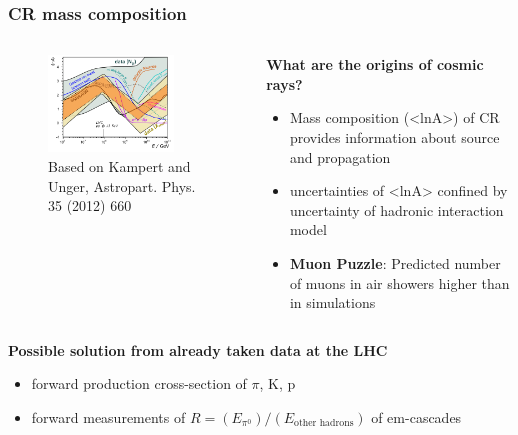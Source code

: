 \documentclass[aspectratio=1610, 9pt]{beamer}
\begin{document}
\begin{frame}\frametitle{CR mass composition}
  \begin{columns}
    \begin{column}[c]{0.48\textwidth}
      \begin{figure}
        \includegraphics[width=0.8\textwidth]{lnA_all.png}
        \caption{Based on Kampert and Unger, Astropart. Phys. 35 (2012) 660}
      \end{figure}
    \end{column}
    \begin{column}[c]{0.48\textwidth}
      \textbf{What are the origins of cosmic rays?}
      \begin{itemize}
        \item Mass composition (<lnA>) of CR provides information about source and propagation
        \item uncertainties of <lnA> confined by uncertainty of hadronic interaction model
        \item \textbf{Muon Puzzle}: Predicted number of muons in air showers higher than in simulations
      \end{itemize}
    \end{column}
  \end{columns}
  \textbf{Possible solution from already taken data at the LHC}
  \begin{itemize}
    \item forward production cross-section of $\pi$, K, p
    \item forward measurements of $R = (E_{\pi^0}) / (E_\text{other hadrons})$ of em-cascades
  \end{itemize}
\end{frame}
\end{document}

